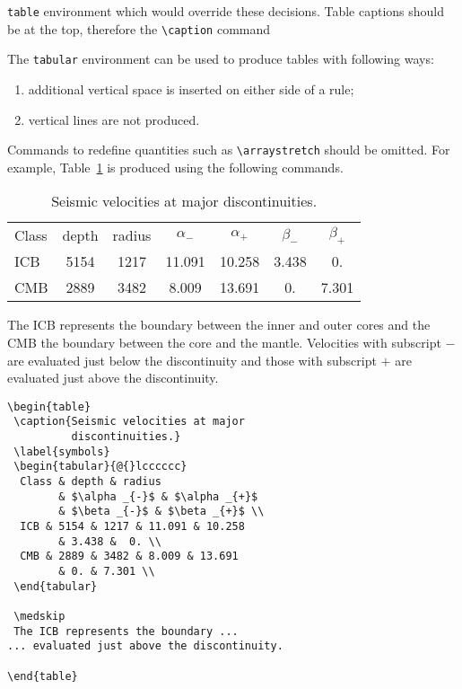 \verb"table" environment which would override these decisions. Table
captions should be at the top, therefore the \verb"\caption" command

The \verb"tabular" environment can be used to produce tables with
following ways:
\begin{enumerate}
  \item additional vertical space is inserted on either side of a rule;
  \item vertical lines are not produced.
\end{enumerate}
Commands to redefine quantities such as \verb"\arraystretch" should be
omitted. For example, Table~\ref{symbols} is produced using the
following commands.
\begin{table}
 \caption{Seismic velocities at major discontinuities.}\label{symbols}
 \begin{tabular}{@{}lcccccc}
  Class & depth & radius
        & $\alpha _{-}$ & $\alpha _{+}$
        & $\beta _{-}$ & $\beta _{+}$ \\
  ICB & 5154 & 1217 & 11.091 & 10.258
        & 3.438 &  0. \\
  CMB & 2889 & 3482 & 8.009 & 13.691
        & 0. & 7.301 \\
 \end{tabular}

 \medskip
 The ICB represents the boundary between the inner and outer cores and
the CMB the boundary between the core and the mantle.  Velocities with
subscript $-$ are evaluated just below the discontinuity and
those with subscript $+$ are evaluated just above the discontinuity.
\end{table}
\begin{verbatim}
\begin{table}
 \caption{Seismic velocities at major
          discontinuities.}
 \label{symbols}
 \begin{tabular}{@{}lcccccc}
  Class & depth & radius
        & $\alpha _{-}$ & $\alpha _{+}$
        & $\beta _{-}$ & $\beta _{+}$ \\
  ICB & 5154 & 1217 & 11.091 & 10.258
        & 3.438 &  0. \\
  CMB & 2889 & 3482 & 8.009 & 13.691
        & 0. & 7.301 \\
 \end{tabular}

 \medskip
 The ICB represents the boundary ...
... evaluated just above the discontinuity.

\end{table}
\end{verbatim}

